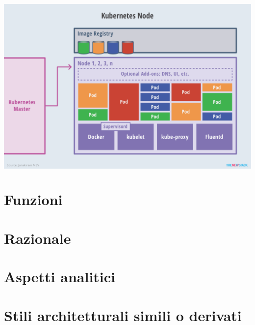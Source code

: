 \documentclass[12pt, a4paper]{report}
\begin{document}
\begin{center}
  \includegraphics[scale=0.5]{Images/Kubernetes-workers}
\end{center}
\chapter{Funzioni}

\chapter{Razionale}
\chapter{Aspetti analitici}
\chapter{Stili architetturali simili o derivati}

\end{document}
